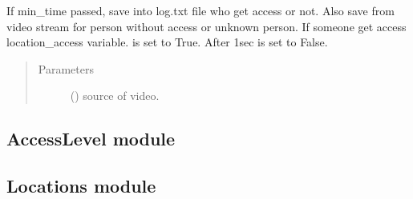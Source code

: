 \documentclass[letterpaper,10pt,english]{sphinxmanual}
\begin{document}
\begin{fulllineitems}
\begin{fulllineitems}
\label{\detokenize{doc/Access/AccesAfterTime:AccesAfterTime.AccessAfterTime.log_access}}
If min\_time passed, save into log.txt file who get access or not. Also save from video stream
for person without access or unknown person. If someone get access location\_access variable.
is set to True. After 1sec is set to False.
\begin{quote}\begin{description}
\item[{Parameters}] \leavevmode
{} ({\hyperref[\detokenize{doc/VideoStream/WebCamStream:WebCamStream.WebCamStream}]{}}) \textendash{} source of video.

\end{description}\end{quote}

\end{fulllineitems}


\end{fulllineitems}



\subsection{AccessLevel module}
\label{\detokenize{doc/Access/AccessLevel:accesslevel-module}}\label{\detokenize{doc/Access/AccessLevel::doc}}

\subsection{Locations module}
\label{\detokenize{doc/Access/Locations:module-Locations}}\label{\detokenize{doc/Access/Locations:locations-module}}\label{\detokenize{doc/Access/Locations::doc}}
\end{document}
